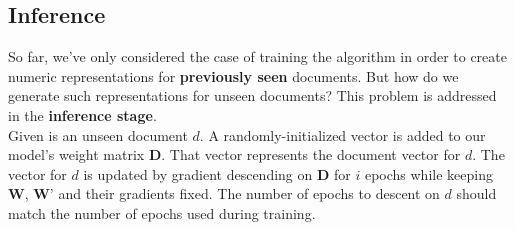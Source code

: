 \documentclass[english]{lni}
\begin{document}
\subsection{Inference}
So far, we've only considered the case of training the algorithm in order to create numeric representations for \textbf{previously seen} documents.
But how do we generate such representations for unseen documents? This problem is addressed in the \textbf{inference stage}.\\
Given is an unseen document $d$. A randomly-initialized vector is added to our model's weight matrix $\textbf{D}$.
That vector represents the document vector for $d$. 
The vector for $d$ is updated by gradient descending on $\textbf{D}$ for $i$ epochs while keeping $\textbf{W}$, $\textbf{W'}$ and their gradients fixed.
The number of epochs to descent on $d$ should match the number of epochs used during training. 
\clearpage
\end{document}

